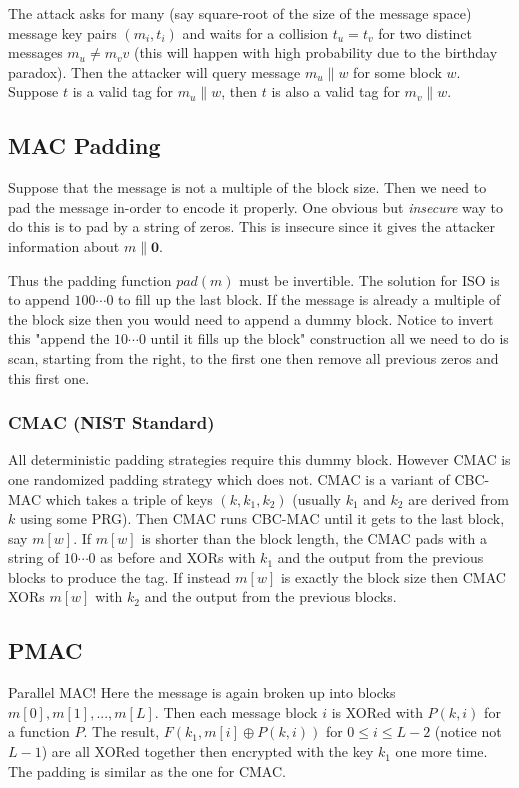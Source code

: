 \documentclass[twoside]{article}
\def\xor{\oplus}
\begin{document}
The attack asks for many (say square-root of the size of the message space) message key pairs $(m_i, t_i)$ and waits for a collision $t_u = t_v$ for two distinct messages $m_u \neq m_vv$ (this will happen with high probability due to the birthday paradox). Then the attacker will query message $m_u \parallel w$ for some block $w$. Suppose $t$ is a valid tag for $m_u \parallel w$, then $t$ is also a valid tag for $m_v \parallel w$. 

\subsection{MAC Padding}
Suppose that the message is not a multiple of the block size. Then we need to pad the message in-order to encode it properly. One obvious but \emph{insecure} way to do this is to pad by a string of zeros. This is insecure since it gives the attacker information about $m \parallel \mathbf{0}$.

Thus the padding function $pad(m)$ must be invertible. The solution for ISO is to append $100\cdots 0$ to fill up the last block. If the message is already a multiple of the block size then you would need to append a dummy block. Notice to invert this "append the $10 \cdots 0$ until it fills up the block" construction all we need to do is scan, starting from the right, to the first one then remove all previous zeros and this first one.

\subsubsection{CMAC (NIST Standard)}
All deterministic padding strategies require this dummy block. However CMAC is one randomized padding strategy which does not. CMAC is a variant of CBC-MAC which takes a triple of keys $(k, k_1, k_2)$ (usually $k_1$ and $k_2$ are derived from $k$ using some PRG). Then CMAC runs CBC-MAC until it gets to the last block, say $m[w]$. If $m[w]$ is shorter than the block length, the CMAC pads with a string of $10\cdots0$ as before and XORs with $k_1$ and the output from the previous blocks to produce the tag. If instead $m[w]$ is exactly the block size then CMAC XORs $m[w]$ with $k_2$ and the output from the previous blocks.  

\subsection{PMAC}
Parallel MAC! Here the message is again broken up into blocks $m[0], m[1], ..., m[L]$. Then each message block $i$ is XORed with $P(k, i)$ for a function $P$. The result, $F(k_1, m[i] \xor P(k, i))$ for $0 \leq i \leq L-2$ (notice not $L-1$) are all XORed together then encrypted with the key $k_1$ one more time. The padding is similar as the one for CMAC.
\end{document}
